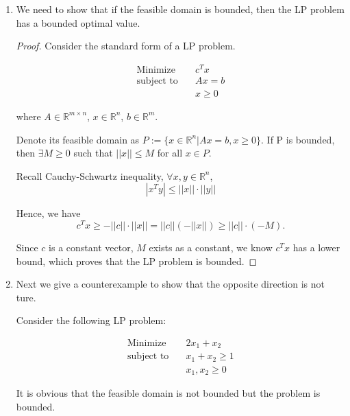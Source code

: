 \documentclass[12pt]{article}
\begin{document}
\begin{enumerate}
\item
We need to show that if the feasible domain is bounded, then the LP problem has a bounded optimal value.

\begin{proof}

Consider the standard form of a LP problem.

\begin{equation*}
\begin{aligned}
\text{Minimize} \quad & c^Tx \\
\text{subject\  to} \quad & Ax = b \\
 & x \geqslant 0
\end{aligned}
\end{equation*}

where $A \in \mathbb{R}^{m\times n}$, $x\in \mathbb{R}^n$, $b \in \mathbb{R}^m$.

Denote its feasible domain as $P := \{x \in \mathbb{R}^n | Ax = b, x \geqslant 0 \}$. If P is bounded, then $\exists M \geqslant 0$ such that $||x|| \leqslant M$ for all $x \in P$.

Recall Cauchy-Schwartz inequality, $\forall x, y \in \mathbb{R}^n$, 
$$
|x^Ty| \leqslant ||x||\cdot||y||
$$

Hence, we have 
$$
c^Tx \geqslant - ||c||\cdot ||x|| = ||c||(-||x||) \geqslant ||c||\cdot (-M).
$$

Since $c$ is a constant vector, $M$ exists as a constant, we know $c^Tx$ has a lower bound, which proves that the LP problem is bounded.

\end{proof}

\item

Next we give a counterexample to show that the opposite direction is not ture. 

Consider the following LP problem:

\begin{equation}\label{L2}
\begin{aligned}
\text{Minimize} \quad & 2x_1 + x_2 \\
\text{subject\  to} \quad & x_1 + x_2 \geqslant 1 \\
& x_1, x_2 \geqslant 0
\end{aligned}
\end{equation}

It is obvious that the feasible domain is not bounded but the problem is bounded.

\end{enumerate}
\end{document}
